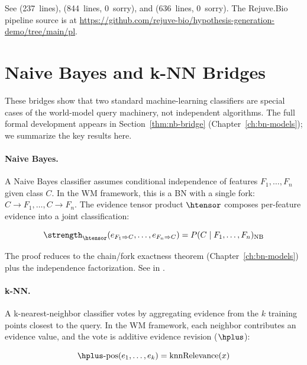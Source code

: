 \documentclass[11pt,openany]{report}
\begin{document}
See  (237~lines),
 (844~lines, 0~sorry),
and  (636~lines,
0~sorry).  The Rejuve.Bio pipeline source is at
\url{https://github.com/rejuve-bio/hypothesis-generation-demo/tree/main/pl}.


\section{Naive Bayes and k-NN Bridges}
\label{sec:nb-knn-bridge}

These bridges show that two standard machine-learning classifiers are
special cases of the world-model query machinery, not independent
algorithms.  The full formal development appears in
Section~\ref{thm:nb-bridge} (Chapter~\ref{ch:bn-models}); we
summarize the key results here.

\paragraph{Naive Bayes.}
A Naive Bayes classifier assumes conditional independence of features
$F_1, \ldots, F_n$ given class $C$.  In the WM framework, this is a
BN with a single fork: $C \to F_1, \ldots, C \to F_n$.  The evidence
tensor product $\htensor$ composes per-feature evidence into a joint
classification:

\begin{theorem}
\[
  \strength_{\htensor}(e_{F_1 \Rightarrow C}, \ldots, e_{F_n \Rightarrow C})
  = P(C \mid F_1, \ldots, F_n)_{\mathrm{NB}}
\]
\end{theorem}

\noindent
The proof reduces to the chain/fork exactness theorem
(Chapter~\ref{ch:bn-models}) plus the independence factorization.
See  in
.

\paragraph{k-NN.}
A k-nearest-neighbor classifier votes by aggregating evidence from
the $k$ training points closest to the query.  In the WM framework,
each neighbor contributes an evidence value, and the vote is additive
evidence revision ($\hplus$):

\begin{theorem}
\[
  \hplus\text{-}\mathrm{pos}(e_1, \ldots, e_k)
  = \mathrm{knnRelevance}(x)
\]
\end{theorem}
\end{document}
